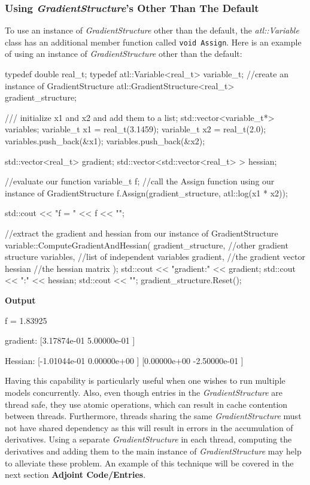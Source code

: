 \documentclass[12pt,a4paper]{article}
\newcommand{\Code}[1]{%
\lstinline{#1}}
\begin{document}
\subsubsection{Using \textit{GradientStructure}'s Other Than The Default}
To use an instance of \textit{GradientStructure} other than the default, the  \textit{atl::Variable} class has an additional member function called \Code{void Assign}. Here is an example of using an instance of \textit{GradientStructure} other than the default:
\begin{cppsource}
    typedef double real_t;
    typedef atl::Variable<real_t> variable_t;
    //create an instance of GradientStructure
    atl::GradientStructure<real_t> gradient_structure;



    /// initialize x1 and x2 and add them to a list;
    std::vector<variable_t*> variables;
    variable_t x1 = real_t(3.1459);
    variable_t x2 = real_t(2.0);
    variables.push_back(&x1);
    variables.push_back(&x2);

    std::vector<real_t> gradient;
    std::vector<std::vector<real_t> > hessian;


        //evaluate our function
        variable_t f;
        //call the Assign function using our instance of GradientStructure
        f.Assign(gradient_structure, atl::log(x1 * x2));

        std::cout << "f = " << f << "\n\n";

        //extract the gradient and hessian from our instance of GradientStructure
         variable::ComputeGradientAndHessian(
        gradient_structure,      //other gradient structure 
        variables,                    //list of independent variables
         gradient,                    //the gradient vector
         hessian                      //the hessian matrix
         );
        std::cout << "gradient:\n" << gradient;
        std::cout << "\n\nHessian:\n" << hessian;
        std::cout << "\n\n";
        gradient_structure.Reset();
\end{cppsource}
\textbf{Output}
\begin{myoutput}
f = 1.83925

gradient:
[3.17874e-01    5.00000e-01    ]

Hessian:
[-1.01044e-01   0.00000e+00    ]
[0.00000e+00    -2.50000e-01   ]

\end{myoutput} 
Having this capability is particularly useful when one wishes to run multiple models concurrently. Also, even though entries in the \textit{GradientStructure} are thread safe, they use atomic operations, which can result in cache contention between threads. Furthermore, threads sharing the same \textit{GradientStructure} must not have shared dependency as this will result in errors in the accumulation of derivatives. Using a separate \textit{GradientStructure} in each thread, computing the derivatives and adding them to the main instance of \textit{GradientStructure} may help to alleviate these problem. An example of this technique will be covered in the next section \textbf{Adjoint Code/Entries}.
\end{document}
